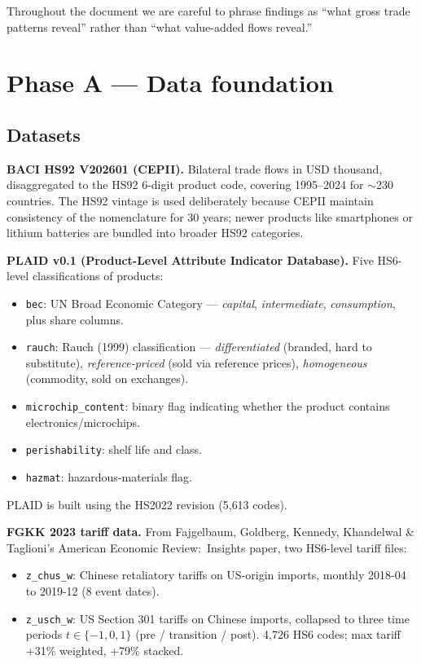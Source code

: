 \documentclass[11pt,a4paper]{article}
\begin{document}
Throughout the document we are careful to phrase findings as
``what gross trade patterns reveal'' rather than ``what value-added flows reveal.''

\section{Phase A — Data foundation}

\subsection{Datasets}

\textbf{BACI HS92 V202601 (CEPII).} Bilateral trade flows in USD thousand,
disaggregated to the HS92 6-digit product code, covering 1995--2024 for
$\sim$230 countries. The HS92 vintage is used deliberately because CEPII
maintain consistency of the nomenclature for 30 years; newer products like
smartphones or lithium batteries are bundled into broader HS92 categories.

\textbf{PLAID v0.1 (Product-Level Attribute Indicator Database).} Five
HS6-level classifications of products:
\begin{itemize}[leftmargin=*]
  \item \texttt{bec}: UN Broad Economic Category — \emph{capital},
        \emph{intermediate}, \emph{consumption}, plus share columns.
  \item \texttt{rauch}: Rauch (1999) classification —
        \emph{differentiated} (branded, hard to substitute),
        \emph{reference-priced} (sold via reference prices),
        \emph{homogeneous} (commodity, sold on exchanges).
  \item \texttt{microchip\_content}: binary flag indicating whether the
        product contains electronics/microchips.
  \item \texttt{perishability}: shelf life and class.
  \item \texttt{hazmat}: hazardous-materials flag.
\end{itemize}
PLAID is built using the HS2022 revision (5{,}613 codes).

\textbf{FGKK 2023 tariff data.} From Fajgelbaum, Goldberg, Kennedy,
Khandelwal \& Taglioni's American Economic Review:~Insights paper, two
HS6-level tariff files:
\begin{itemize}[leftmargin=*]
  \item \texttt{z\_chus\_w}: Chinese retaliatory tariffs on US-origin
        imports, monthly 2018-04 to 2019-12 (8 event dates).
  \item \texttt{z\_usch\_w}: US Section 301 tariffs on Chinese imports,
        collapsed to three time periods $t \in \{-1, 0, 1\}$
        (pre / transition / post). 4{,}726 HS6 codes; max tariff +31\%
        weighted, +79\% stacked.
\end{itemize}
\end{document}
